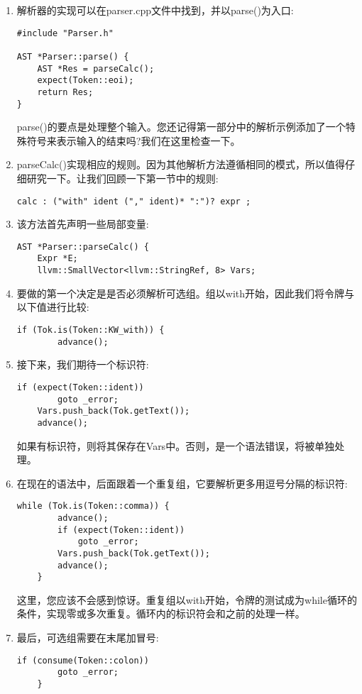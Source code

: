 \begin{enumerate}
\item 解析器的实现可以在parser.cpp文件中找到，并以parse()为入口:
\begin{lstlisting}[caption={}]
#include "Parser.h"

AST *Parser::parse() {
	AST *Res = parseCalc();
	expect(Token::eoi);
	return Res;
}
\end{lstlisting}
parse()的要点是处理整个输入。您还记得第一部分中的解析示例添加了一个特殊符号来表示输入的结束吗?我们在这里检查一下。

\item parseCalc()实现相应的规则。因为其他解析方法遵循相同的模式，所以值得仔细研究一下。让我们回顾一下第一节中的规则:
\begin{lstlisting}[caption={}]
calc : ("with" ident ("," ident)* ":")? expr ;
\end{lstlisting}

\item 该方法首先声明一些局部变量:
\begin{lstlisting}[caption={}]
AST *Parser::parseCalc() {
	Expr *E;
	llvm::SmallVector<llvm::StringRef, 8> Vars;
\end{lstlisting}

\item 要做的第一个决定是是否必须解析可选组。组以with开始，因此我们将令牌与以下值进行比较:
\begin{lstlisting}[caption={}]
	if (Tok.is(Token::KW_with)) {
		advance();
\end{lstlisting}

\item 接下来，我们期待一个标识符:
\begin{lstlisting}[caption={}]
	if (expect(Token::ident))
		goto _error;
	Vars.push_back(Tok.getText());
	advance();
\end{lstlisting}
如果有标识符，则将其保存在Vars中。否则，是一个语法错误，将被单独处理。

\item 在现在的语法中，后面跟着一个重复组，它要解析更多用逗号分隔的标识符:
\begin{lstlisting}[caption={}]
	while (Tok.is(Token::comma)) {
		advance();
		if (expect(Token::ident))
			goto _error;
		Vars.push_back(Tok.getText());
		advance();
	}
\end{lstlisting}
这里，您应该不会感到惊讶。重复组以with开始，令牌的测试成为while循环的条件，实现零或多次重复。循环内的标识符会和之前的处理一样。

\item 最后，可选组需要在末尾加冒号:
\begin{lstlisting}[caption={}]
	if (consume(Token::colon))
		goto _error;
	}
\end{lstlisting}


\end{enumerate}
